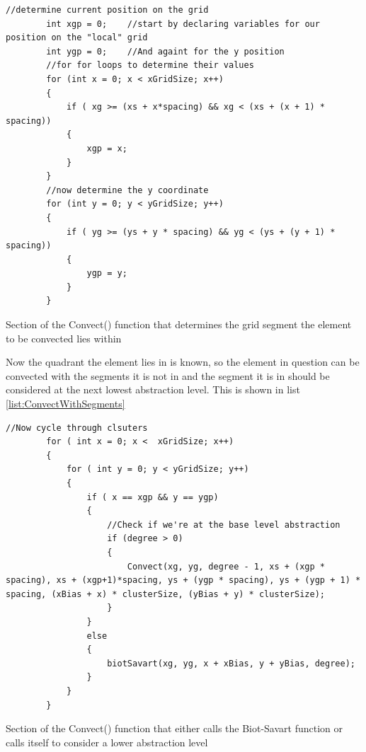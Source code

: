 \begin{listing}[H]
\begin{verbatim}
//determine current position on the grid
        int xgp = 0;    //start by declaring variables for our position on the "local" grid
        int ygp = 0;    //And againt for the y position
        //for for loops to determine their values
        for (int x = 0; x < xGridSize; x++)
        {
            if ( xg >= (xs + x*spacing) && xg < (xs + (x + 1) * spacing))
            {
                xgp = x;
            }
        }
        //now determine the y coordinate
        for (int y = 0; y < yGridSize; y++)
        {
            if ( yg >= (ys + y * spacing) && yg < (ys + (y + 1) * spacing))
            {
                ygp = y;
            }
        }
\end{verbatim}
\caption{Section of the Convect() function that determines the grid segment the element to be convected lies within}
\label{list:ConvectDetermineMyQuadrant}
\end{listing}

Now the quadrant the element lies in is known, so the element in question can be convected with the segments it is not in and the segment it is in should be considered at the next lowest abstraction level. This is shown in list \ref{list:ConvectWithSegments}

\begin{listing}[H]
\begin{verbatim}
//Now cycle through clsuters
        for ( int x = 0; x <  xGridSize; x++)
        {
            for ( int y = 0; y < yGridSize; y++)
            {
                if ( x == xgp && y == ygp)
                {
                    //Check if we're at the base level abstraction
                    if (degree > 0)
                    {
                        Convect(xg, yg, degree - 1, xs + (xgp * spacing), xs + (xgp+1)*spacing, ys + (ygp * spacing), ys + (ygp + 1) * spacing, (xBias + x) * clusterSize, (yBias + y) * clusterSize);
                    }                
                }
                else
                {
                    biotSavart(xg, yg, x + xBias, y + yBias, degree);
                }
            }
        }
\end{verbatim}
\caption{Section of the Convect() function that either calls the Biot-Savart function or calls itself to consider a lower abstraction level}
\label{list:ConvectWithSegments}
\end{listing}

